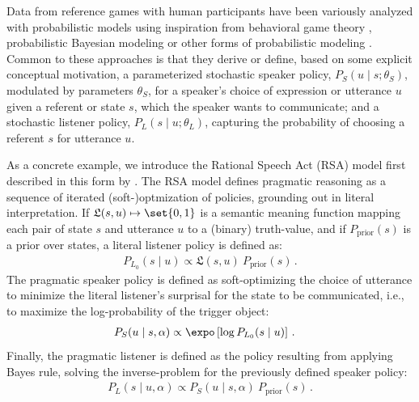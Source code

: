 \documentclass[fleqn]{article}
\begin{document}
Data from reference games with human participants have been variously analyzed with probabilistic models using inspiration from behavioral game theory \citep[e.g.,][]{DegenFranke2013:Cost-Based-Prag}, probabilistic Bayesian modeling \citep[e.g.,][]{FrankGoodman2012:Predicting-Prag} or other forms of probabilistic modeling \citep[e.g.,][]{GattGompel2013:Are-we-Bayesian}.
Common to these approaches is that they derive or define, based on some explicit conceptual motivation, a parameterized stochastic speaker policy, $P_{S}(u \mid s; \theta_{S})$, modulated by parameters $\theta_{S}$, for a speaker's choice of expression or utterance $u$ given a referent or state $s$, which the speaker wants to communicate;
and a stochastic listener policy, $P_{L}(s \mid u; \theta_{L})$, capturing the probability of choosing a referent $s$ for utterance $u$.

As a concrete example, we introduce the Rational Speech Act (RSA) model first described in this form by \citet{FrankGoodman2012:Predicting-Prag} \citep[for overview see][]{FrankeJager2015:Probabilistic-p,GoodmanFrank2016:Pragmatic-Langu,StevensBenz2018:Game-Theoretic-,ScontrasTessler2021:A-practical-int,Degen2023:The-Rational-Sp}.
The RSA model defines pragmatic reasoning as a sequence of iterated (soft-)optmization of policies, grounding out in literal interpretation.
If $\mathfrak{L}(s,u) \mapsto \set{0,1}$ is a semantic meaning function mapping each pair of state $s$ and utterance $u$ to a (binary) truth-value, and if $P_{\text{prior}}(s)$ is a prior over states, a literal listener policy is defined as:
%
\begin{align*}
 P_{L_{0}}(s \mid u) \propto \mathfrak{L}(s,u)\  P_{\text{prior}}(s)\,.
\end{align*}
%
The pragmatic speaker policy is defined as soft-optimizing the choice of utterance to minimize the literal listener's surprisal for the state to be communicated, i.e., to maximize the log-probability of the trigger object:
%
\begin{align}
  \label{eq:RSA-speaker}
  P_{S}(u \mid s, \alpha) & \propto \expo \left [ \log P_{L_{0}}(s \mid u) \right ] \,.
\end{align}
%
Finally, the pragmatic listener is defined as the policy resulting from applying Bayes rule, solving the inverse-problem for the previously defined speaker policy:
%
\begin{align}
  \label{eq:RSA-interpreter}
  P_{L}(s \mid u, \alpha) \propto  P_{S}(u \mid s, \alpha) \  P_{\text{prior}}(s) \,.
\end{align}
\end{document}
